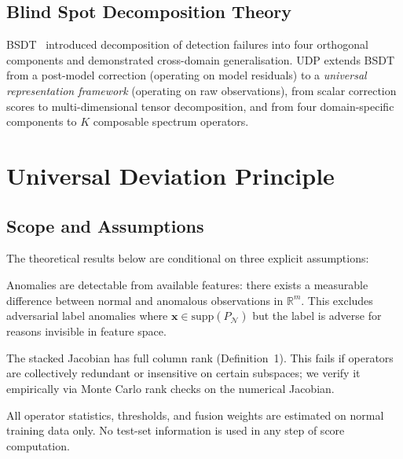 \documentclass[journal]{IEEEtran}
\newcommand{\R}{\mathbb{R}}
\begin{document}
\subsection{Blind Spot Decomposition Theory}

BSDT~\cite{odeyemi2025bsdt} introduced decomposition of detection failures into four orthogonal components and demonstrated cross-domain generalisation. UDP extends BSDT from a post-model correction (operating on model residuals) to a \textit{universal representation framework} (operating on raw observations), from scalar correction scores to multi-dimensional tensor decomposition, and from four domain-specific components to $K$ composable spectrum operators.

\section{Universal Deviation Principle}
\label{sec:theory}

\subsection{Scope and Assumptions}
\label{ssec:assumptions}

The theoretical results below are conditional on three explicit assumptions:

\begin{description}[leftmargin=*,labelwidth=1.8cm]
\item[A1 (Observability)] Anomalies are detectable from available features: there exists a measurable difference between normal and anomalous observations in $\R^m$. This excludes adversarial label anomalies where $\mathbf{x} \in \text{supp}(P_{\mathcal{N}})$ but the label is adverse for reasons invisible in feature space.
\item[A2 (Operator-family richness)] The stacked Jacobian has full column rank (Definition~1).  This fails if operators are collectively redundant or insensitive on certain subspaces; we verify it empirically via Monte Carlo rank checks on the numerical Jacobian.
\item[A3 (Calibration discipline)] All operator statistics, thresholds, and fusion weights are estimated on normal training data only. No test-set information is used in any step of score computation.
\end{description}
\end{document}
